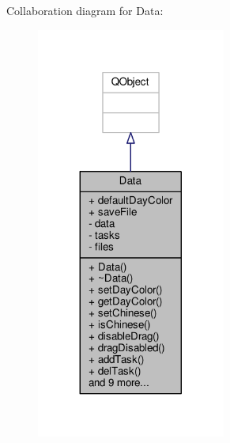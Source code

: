 Collaboration diagram for Data\+:
\nopagebreak
\begin{figure}[H]
\begin{center}
\leavevmode
\includegraphics[width=176pt]{classData__coll__graph}
\end{center}
\end{figure}
